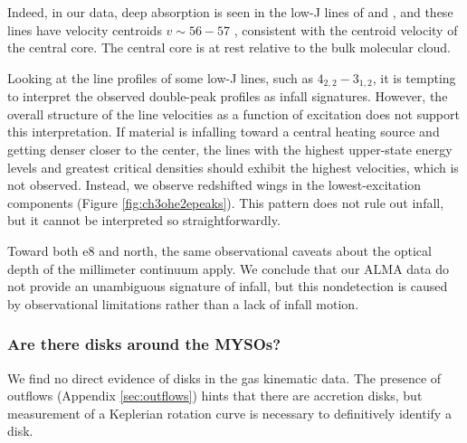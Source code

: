 \documentclass[twocolumn]{aastex61}
\begin{document}
Indeed, in our data, deep absorption is seen in the low-J lines of
\formaldehyde and \methanol, and these lines have velocity centroids
$v\sim56-57$ \kms, consistent with the centroid velocity of the central core.
The central core is at rest relative to the bulk molecular cloud.

Looking at the line profiles of some low-J lines, such as \methanol
$4_{2,2}-3_{1,2}$, it is tempting to interpret the observed double-peak
profiles as infall signatures.  However, the overall structure of the line
velocities as a function of excitation does not support this interpretation.
If material is infalling toward a central heating source and getting denser
closer to the center, the lines with the highest upper-state energy
levels and greatest critical densities should exhibit the highest
velocities, which is not observed.  Instead, we observe redshifted
wings in the lowest-excitation components (Figure \ref{fig:ch3ohe2epeaks}).
This pattern does not rule out infall, but it cannot be interpreted
so straightforwardly. 





Toward both e8 and north, the same observational caveats about the optical
depth of the millimeter continuum apply.  We conclude that our ALMA data do
not provide an unambiguous signature of infall, but this nondetection is caused
by observational limitations rather than a lack of infall motion.

\subsubsection{Are there disks around the MYSOs?}
\label{sec:disks}
We find no direct evidence of disks in the gas kinematic data.  The presence of
outflows (Appendix \ref{sec:outflows}) hints that there are accretion disks,
but measurement of a Keplerian rotation curve is necessary to definitively
identify a disk.
\end{document}
